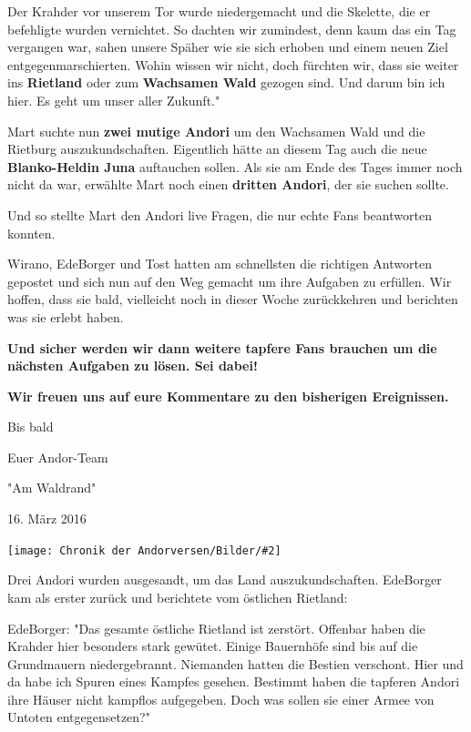 \documentclass[10pt, a4paper, oneside]{book}
\newcommand{\bildmitts}[2][height=0.32\textwidth,width=0.48\textwidth,keepaspectratio]{%
    \begin{center}
        \texttt{[image: Chronik der Andorversen/Bilder/\#2]}
    \end{center}
}
\begin{document}
\begin{multicols}{2}

Der Krahder vor unserem Tor wurde niedergemacht und die Skelette, die er befehligte wurden vernichtet. So dachten wir zumindest, denn kaum das ein Tag vergangen war, sahen unsere Späher wie sie sich erhoben und einem neuen Ziel entgegenmarschierten. Wohin wissen wir nicht, doch fürchten wir, dass sie weiter ins \textbf{Rietland} oder zum \textbf{Wachsamen Wald} gezogen sind. Und darum bin ich hier. Es geht um unser aller Zukunft."

Mart suchte nun \textbf{zwei mutige Andori} um den Wachsamen Wald und die Rietburg auszukundschaften. Eigentlich hätte an diesem Tag auch die neue \textbf{Blanko-Heldin Juna} auftauchen sollen. Als sie am Ende des Tages immer noch nicht da war, erwählte Mart noch einen \textbf{dritten Andori}, der sie suchen sollte.

Und so stellte Mart den Andori live Fragen, die nur echte Fans beantworten konnten.

Wirano, EdeBorger und Tost hatten am schnellsten die richtigen Antworten gepostet und sich nun auf den Weg gemacht um ihre Aufgaben zu erfüllen. Wir hoffen, dass sie bald, vielleicht noch in dieser Woche zurückkehren und berichten was sie erlebt haben.

\textbf{Und sicher werden wir dann weitere tapfere Fans brauchen um die nächsten Aufgaben zu lösen. Sei dabei!}

\textbf{Wir freuen uns auf eure Kommentare zu den bisherigen Ereignissen.}

 

Bis bald

Euer Andor-Team


\begin{center}
    "Am Waldrand"

    16. März 2016
\end{center}

\bildmitts{AA2016 Blog 2.jpeg}

Drei Andori wurden ausgesandt, um das Land auszukundschaften. EdeBorger kam als erster zurück und berichtete vom östlichen Rietland:

EdeBorger: "Das gesamte östliche Rietland ist zerstört. Offenbar haben die Krahder hier besonders stark gewütet. Einige Bauernhöfe sind bis auf die Grundmauern niedergebrannt. Niemanden hatten die Bestien verschont. Hier und da habe ich Spuren eines Kampfes gesehen. Bestimmt haben die tapferen Andori ihre Häuser nicht kampflos aufgegeben. Doch was sollen sie einer Armee von Untoten entgegensetzen?"


\end{multicols}
\end{document}

